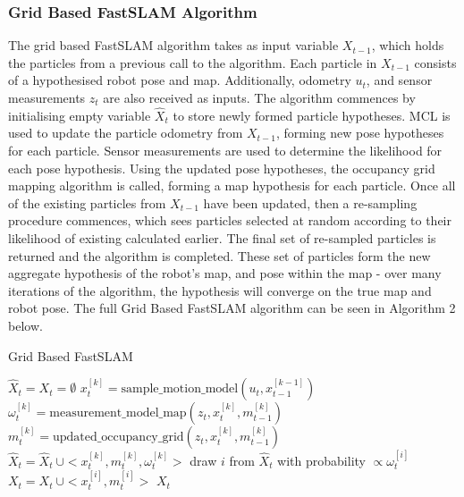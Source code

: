 \documentclass[a4paper]{article}
\begin{document}
\subsubsection{Grid Based FastSLAM Algorithm}
The grid based FastSLAM algorithm takes as input variable $X_{t-1}$, which holds the particles from a previous call to the algorithm. Each particle in $X_{t-1}$ consists of a hypothesised robot pose and map. Additionally, odometry $u_t$, and sensor measurements $z_t$ are also received as inputs. The algorithm commences by initialising empty variable $\hat{X}_t$ to store newly formed particle hypotheses. MCL is used to update the particle odometry from $X_{t-1}$, forming new pose hypotheses for each particle. Sensor measurements are used to determine the likelihood for each pose hypothesis. Using the updated pose hypotheses, the occupancy grid mapping algorithm is called, forming a map hypothesis for each particle. Once all of the existing particles from $X_{t-1}$ have been updated, then a re-sampling procedure commences, which sees particles selected at random according to their likelihood of existing calculated earlier. The final set of re-sampled particles is returned and the algorithm is completed. These set of particles form the new aggregate hypothesis of the robot's map, and pose within the map - over many iterations of the algorithm, the hypothesis will converge on the true map and robot pose. The full Grid Based FastSLAM algorithm can be seen in Algorithm 2 below.

\begin{algorithm}[h]
\caption{Grid Based FastSLAM}
\begin{algorithmic}[1]
\State $\hat{X}_t = X_t = \emptyset$
	\State $x_t^{[k]} = \text{sample\_motion\_model}(u_t, x_{t-1}^{[k-1]})$
	\State $\omega_t^{[k]} = \text{measurement\_model\_map}(z_t, x_t^{[k]}, m_{t-1}^{[k]})$
	\State $m_t^{[k]} = \text{updated\_occupancy\_grid}(z_t, x_t^{[k]}, m_{t-1}^{[k]})$
	\State $\hat{X}_t = \hat{X}_t \ \cup <x_t^{[k]}, m_t^{[k]}, \omega_t^{[k]}>$
\EndFor
{}
	\State draw $i$ from $\hat{X}_t$ with probability $\propto \omega_t^{[i]}$
	\State $X_t = X_t \ \cup <x_t^{[i]}, m_t^{[i]}>$
\EndFor
\Return $X_t$
\EndProcedure
\end{algorithmic}
\end{algorithm}

\newpage
\end{document}
